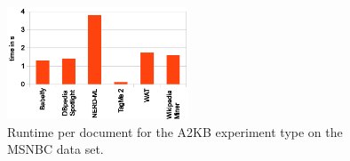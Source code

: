 \begin{figure}[ht]
\centering
\includegraphics[width=0.48\textwidth]{chapter_three/benchmarking/ESWC_GERBIL_demo/needed_times.eps}
\caption{Runtime per document for the A2KB experiment type on the MSNBC data set.}
\label{cha333:fig:runtime}
\end{figure}

